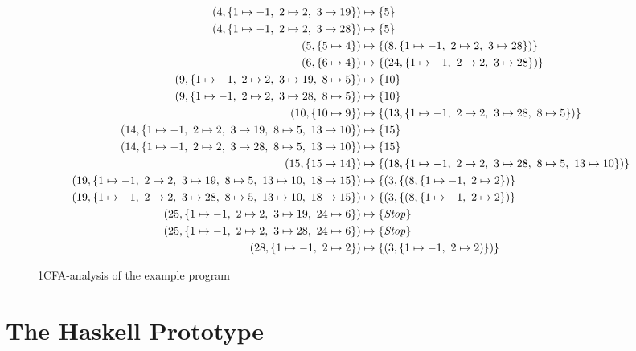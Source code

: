 \documentclass[a4paper,halfparskip,DIV=10,11pt]{scrbook}
\begin{document}
\begin{sidewaysfigure}
\begin{framed}
\vspace{-1em}
\begin{align*}
(4,\{1\mapsto -1,\ 2\mapsto 2,\ 3\mapsto 19\}) &\mapsto \{5\}\\
(4,\{1\mapsto -1,\ 2\mapsto 2,\ 3\mapsto 28\}) &\mapsto \{5\}\\
(5,\{5\mapsto 4\}) &\mapsto \{(8,\{1 \mapsto -1,\ 2\mapsto 2,\ 3 \mapsto 28\})\}\\
(6,\{6\mapsto 4\}) &\mapsto \{(24,\{1 \mapsto -1,\ 2\mapsto 2,\ 3 \mapsto 28\})\}\\
(9,\{1\mapsto -1,\ 2\mapsto 2,\ 3\mapsto 19,\ 8\mapsto 5\}) &\mapsto \{10\}\\
(9,\{1\mapsto -1,\ 2\mapsto 2,\ 3\mapsto 28,\ 8\mapsto 5\}) &\mapsto \{10\}\\
(10,\{10\mapsto 9\}) &\mapsto \{(13, \{1 \mapsto -1,\ 2\mapsto 2,\ 3 \mapsto 28,\ 8\mapsto 5\})\}\\
(14,\{1\mapsto -1,\ 2\mapsto 2,\ 3\mapsto 19,\ 8\mapsto 5,\ 13\mapsto 10\}) &\mapsto \{15\}\\
(14,\{1\mapsto -1,\ 2\mapsto 2,\ 3\mapsto 28,\ 8\mapsto 5,\ 13\mapsto 10\}) &\mapsto \{15\}\\
(15,\{15\mapsto 14\}) &\mapsto \{(18,\{1\mapsto -1,\ 2\mapsto 2,\ 3\mapsto 28,\ 8\mapsto 5,\ 13\mapsto 10\})\}\\
(19,\{1\mapsto -1,\ 2\mapsto 2,\ 3\mapsto 19,\ 8\mapsto 5,\ 13\mapsto 10,\ 18\mapsto 15\}) &\mapsto \{(3, \{(8,\{1 \mapsto -1,\ 2\mapsto 2\})\}\\
(19,\{1\mapsto -1,\ 2\mapsto 2,\ 3\mapsto 28,\ 8\mapsto 5,\ 13\mapsto 10,\ 18\mapsto 15\}) &\mapsto \{(3, \{(8,\{1 \mapsto -1,\ 2\mapsto 2\})\}\\
(25,\{1\mapsto -1,\ 2\mapsto 2,\ 3\mapsto 19,\ 24\mapsto 6\}) &\mapsto \{\text{\textit{Stop}}\}\\
(25,\{1\mapsto -1,\ 2\mapsto 2,\ 3\mapsto 28,\ 24\mapsto 6\}) &\mapsto \{\text{\textit{Stop}}\}\\
(28,\{1\mapsto -1,\ 2\mapsto 2\}) &\mapsto \{(3,\{1 \mapsto -1,\ 2\mapsto 2)\})\}
\end{align*}
\end{framed}
\caption{1CFA-analysis of the example program}
\label{fig:examplecfa1}
\end{sidewaysfigure}


\chapter{The Haskell Prototype}
\label{chaphaskell}
\end{document}
